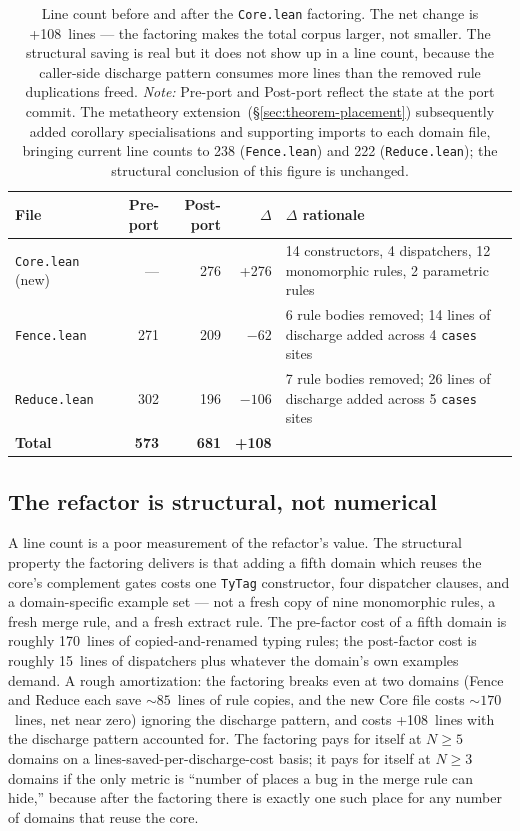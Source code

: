 \documentclass[acmsmall,screen,review,anonymous,nonacm]{acmart}
\newcommand{\TyTag}{\texttt{TyTag}}
\begin{document}
\begin{table}[t]
\caption{Line count before and after the \texttt{Core.lean} factoring. The net change is +108~lines --- the factoring makes the total corpus larger, not smaller. The structural saving is real but it does not show up in a line count, because the caller-side discharge pattern consumes more lines than the removed rule duplications freed. \emph{Note:} Pre-port and Post-port reflect the state at the port commit. The metatheory extension~(\S\ref{sec:theorem-placement}) subsequently added corollary specialisations and supporting imports to each domain file, bringing current line counts to 238 (\texttt{Fence.lean}) and 222 (\texttt{Reduce.lean}); the structural conclusion of this figure is unchanged.}
\label{fig:line-count}
\small
\begin{tabular}{@{}lrrrl@{}}
\toprule
File & Pre-port & Post-port & $\Delta$ & $\Delta$ rationale \\
\midrule
\texttt{Core.lean} (new) & --- & 276 & +276 & 14 constructors, 4 dispatchers, 12 monomorphic rules, 2 parametric rules \\
\texttt{Fence.lean} & 271 & 209 & $-62$ & 6 rule bodies removed; 14 lines of discharge added across 4 \texttt{cases} sites \\
\texttt{Reduce.lean} & 302 & 196 & $-106$ & 7 rule bodies removed; 26 lines of discharge added across 5 \texttt{cases} sites \\
\midrule
\textbf{Total} & \textbf{573} & \textbf{681} & \textbf{+108} & \\
\bottomrule
\end{tabular}
\end{table}

\subsection{The refactor is structural, not numerical}\label{sec:structural-not-numerical}

A line count is a poor measurement of the refactor's value. The structural property the factoring delivers is that adding a fifth domain which reuses the core's complement gates costs one \TyTag{} constructor, four dispatcher clauses, and a domain-specific example set --- not a fresh copy of nine monomorphic rules, a fresh merge rule, and a fresh extract rule. The pre-factor cost of a fifth domain is roughly 170~lines of copied-and-renamed typing rules; the post-factor cost is roughly 15~lines of dispatchers plus whatever the domain's own examples demand. A rough amortization: the factoring breaks even at two domains (Fence and Reduce each save ${\sim}85$~lines of rule copies, and the new Core file costs ${\sim}170$~lines, net near zero) ignoring the discharge pattern, and costs +108~lines with the discharge pattern accounted for. The factoring pays for itself at $N \geq 5$ domains on a lines-saved-per-discharge-cost basis; it pays for itself at $N \geq 3$ domains if the only metric is ``number of places a bug in the merge rule can hide,'' because after the factoring there is exactly one such place for any number of domains that reuse the core.
\end{document}
